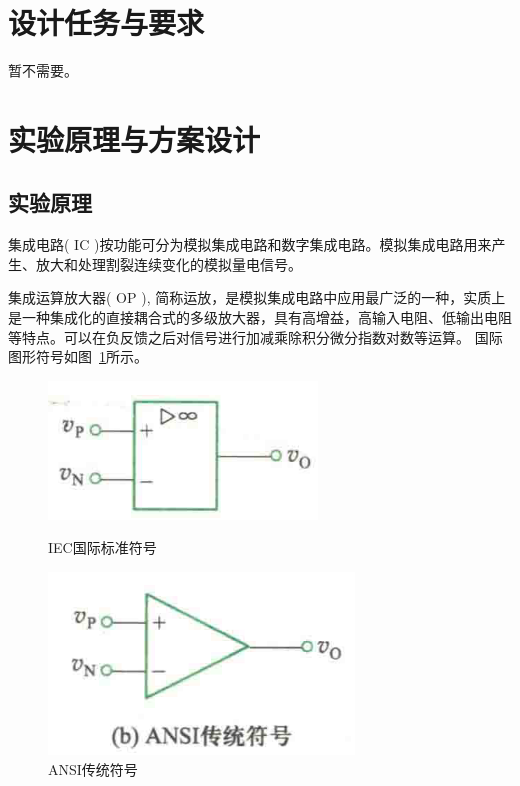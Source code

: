 \documentclass[10pt, a4paper]{article} %
\begin{document}
\section{设计任务与要求}

暂不需要。

\section{实验原理与方案设计}
\subsection{实验原理}
集成电路( IC )按功能可分为模拟集成电路和数字集成电路。模拟集成电路用来产生、放大和处理割裂连续变化的模拟量电信号。

集成运算放大器( OP ), 简称运放，是模拟集成电路中应用最广泛的一种，实质上是一种集成化的直接耦合式的多级放大器，具有高增益，高输入电阻、低输出电阻等特点。可以在负反馈之后对信号进行加减乘除积分微分指数对数等运算。
国际图形符号如图~\hyperref[fig:op_amp_symbol]{\ref{fig:op_amp_symbol}}所示。

\begin{figure}[ht]
    \centering
    \begin{minipage}{0.45\linewidth}
        \centering
        \includegraphics[width=\linewidth]{image/1.png}
        \caption{IEC国际标准符号}
        \label{fig:op_amp_symbol}
    \end{minipage}
    \hfill
    \begin{minipage}{0.45\linewidth}
        \centering
        \includegraphics[width=\linewidth]{image/2.png}
        \caption{ANSI传统符号}
    \end{minipage}
\end{figure}
\end{document}
